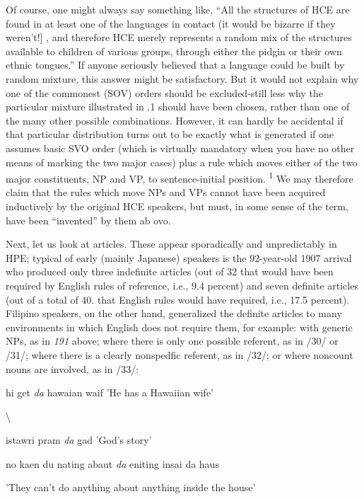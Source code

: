 Of course, one might always say something like, ``All the struc\-tures of HCE are found in at least one of the languages in contact (it would be bizarre if they weren't!] , and therefore HCE merely repre\-sents a random mix of the structures available to children of various groups, through either the pidgin or their own ethnic tongues.'' If anyone seriously believed that a language could be built by random mixture, this answer might be satisfactory. But it would not explain why one of the commonest (SOV) orders should be excluded-still less why the particular mixture illustrated in .1 should have been chosen, rather than one of the many other possible combinations. However, it can hardly be accidental if that particular distribution turns out to be exactly what is generated if one assumes basic SVO order (which is virtually mandatory when you have no other means of mark\-ing the two major cases) plus a rule which moves either of the two major constituents, NP and VP, to sentence-initial position. \textsuperscript{1} We may 
therefore claim that the rules which move NPs and VPs cannot have been acquired inductively by the original HCE speakers, but must, in some sense of the term, have been ``invented'' by them ab ovo.

Next, let us look at articles. These appear sporadically and unpredictably in HPE; typical of early (mainly Japanese) speakers is the 92-year-old 1907 arrival who produced only three indefinite articles (out of 32 that would have been required by English rules of reference, i.e., 9.4 percent) and seven definite articles (out of a total of 40. that English rules would have required, i.e., 17.5 percent). Filipino speakers, on the other hand, generalized the definite articles to many environ\-ments in which English does not require them, for example: with generic NPs, as in \textit{191} above; where there is only one possible refer\-ent, as in /30/ or /31/; where there is a clearly nonspedfic referent, as in /32/; or where noncount nouns are involved, as in /33/:

\ea\label{ex:30}
hi get \textit{da} hawaian waif 'He has a Hawaiian wife'
\glt
\z

{\textbackslash}


\ea\label{ex:31}
istawri pram \textit{da} gad 'God's story'
\glt
\z

\ea\label{ex:32}
no kaen du nating abaut \textit{da} eniting insai da haus
\glt
\z

'They can't do anything about anything inside the house'

